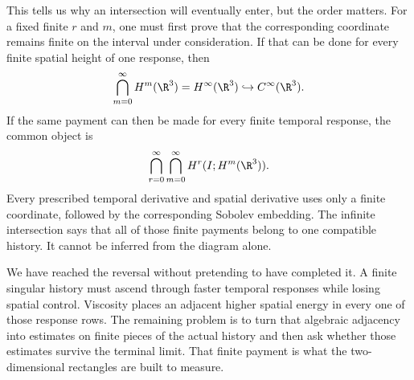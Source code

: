 This tells us why an intersection will eventually enter, but the order matters.
For a fixed finite \(r\) and \(m\), one must first prove that the corresponding
coordinate remains finite on the interval under consideration.  If that can be
done for every finite spatial height of one response, then
\[
  \bigcap_{m=0}^{\infty}H^m(\R^3)
  =H^\infty(\R^3)
  \hookrightarrow C^\infty(\R^3).
\]
If the same payment can then be made for every finite temporal response, the
common object is
\begin{equation}\label{eq:BodyDesiredMixedIntersection}
  \bigcap_{r=0}^{\infty}
  \bigcap_{m=0}^{\infty}
  H^r(I;H^m(\R^3)).
\end{equation}
Every prescribed temporal derivative and spatial derivative uses only a finite
coordinate, followed by the corresponding Sobolev embedding.  The infinite
intersection says that all of those finite payments belong to one compatible
history.  It cannot be inferred from the diagram alone.

We have reached the reversal without pretending to have completed it.  A
finite singular history must ascend through faster temporal responses while
losing spatial control.  Viscosity places an adjacent higher spatial energy in
every one of those response rows.  The remaining problem is to turn that
algebraic adjacency into estimates on finite pieces of the actual history and
then ask whether those estimates survive the terminal limit.  That finite
payment is what the two-dimensional rectangles are built to measure.
